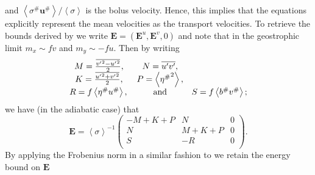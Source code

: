 \documentclass[10pt,a4paper]{report}
\newcommand*\thkmean[1]{\overline{#1}}
\newcommand*\thkres[1]{{#1}^{\prime}}
\newcommand*\nthkmean[1]{\left\langle{#1}\right\rangle}
\newcommand*\nthkres[1]{{#1}^{\#}}
\begin{document}
                   and  $\nthkmean{\nthkres{\sigma}\nthkres{\boldsymbol{u}}}/\nthkmean{\sigma}$
                   is the bolus velocity. Hence, this implies that  the equations explicitly
                    represent the mean velocities as the  transport velocities.
                     To retrieve the bounds derived by \cite{marshall2012framework} 
                     we write $\boldsymbol{E} = (\boldsymbol{E}^{u}, \boldsymbol{E}^{v}, 0)$
                     and note that in the geostrophic limit $m_x \sim fv$ and  $m_y \sim -fu$.
                     Then by writing 
                     \begin{equation}
                     \begin{array}{ccc}
                     M = \frac{\thkmean{{\thkres{v}}^{2} - {\thkres{u}}^{2}}}{2}, & 
                     N = \thkmean{\thkres{u}\thkres{v} }, \\
                     K = \frac{\thkmean{{\thkres{u}}^{2} + {\thkres{v}}^{2}}}{2}, & 
                     P =  \nthkmean{{\nthkres{\eta}}^{2}},  \\ 
                     R =  f\nthkmean{\nthkres{\eta}\nthkres{u}}, \, & \rm and  &  
                     S = f\nthkmean{\nthkres{b}\nthkres{v}} ;
                     \end{array} 
                     \end{equation}
                     we have (in the adiabatic case) that
                     \begin{equation}
                     \boldsymbol{E}=\nthkmean{\sigma}^{-1}\left(
                     \begin{array}{ccc}
                     -M+K+P & N & 0 \\
                     N & M+K+P & 0 \\
                     S & -R & 0 \\
                     \end{array}\right).
                     \end{equation}
                     By applying the Frobenius norm in a similar fashion to 
                     \cite{marshall2012framework} we retain the energy bound on
                      $\boldsymbol{E}$
                      
\end{document}
